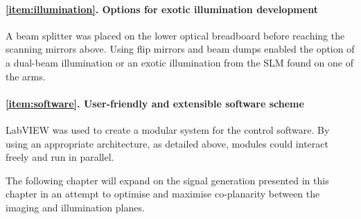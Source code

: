 \paragraph{\ref{item:illumination}. Options for exotic illumination development}
A beam splitter was placed on the lower optical breadboard before reaching the scanning mirrors above. Using flip mirrors and beam dumps enabled the option of a dual-beam illumination or an exotic illumination from the SLM found on one of the arms.

\paragraph{\ref{item:software}. User-friendly and extensible software scheme}
\gls{LabVIEW} was used to create a modular system for the control software.
By using an appropriate architecture, as detailed above, modules could interact freely and run in parallel.

The following chapter will expand on the signal generation presented in this chapter in an attempt to optimise and maximise co-planarity between the imaging and illumination planes.


